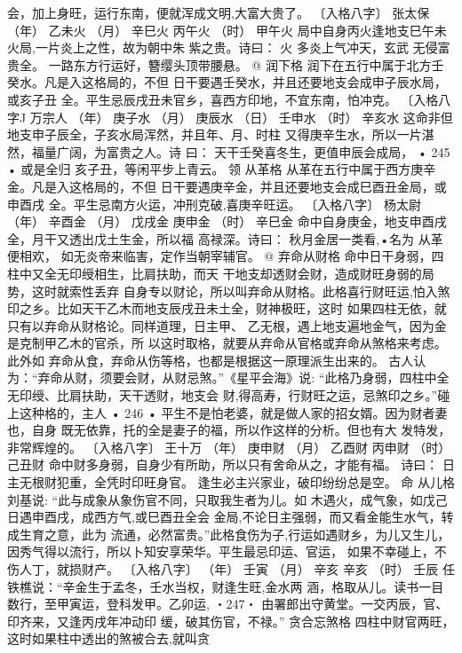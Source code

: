会，加上身旺，运行东南，便就浑成文明,大富大贵了。
〔入格八字〕 张太保
（年） 乙未火
（月） 辛巳火
丙午火
（时） 甲午火
局中自身丙火逢地支巳午未火局,一片炎上之性，故为朝中朱
紫之贵。诗曰：
火 多炎上气冲天，玄武 无侵富贵全。
一路东方行运好，簪缨头顶带腰悬。
@ 润下格
润下在五行中属于北方壬癸水。凡是入这格局的，不但
日干要遇壬癸水，并且还要地支会成申子辰水局，或亥子丑
全。平生忌辰戌丑未官乡，喜西方印地，不宜东南，怕冲克。
〔入格八字J 万宗人
（年） 庚子水
（月） 庚辰水
（日） 壬申水
（时） 辛亥水
这命非但地支申子辰全，子亥水局浑然，并且年、月、时柱
又得庚辛生水，所以一片湛然，福量广阔，为富贵之人。诗
曰：
天干壬癸喜冬生，更值申辰会成局，
• 245 •
或是全归 亥子丑，等闲平步上青云。
领 从革格
从革在五行中属于西方庚辛金。凡是入这格局的，不但
日干要遇庚辛金，并且还要地支会成巳酉丑金局，或申酉戌
全。平生忌南方火运，冲刑克破,喜庚辛旺运。
〔入格八字〕 杨太尉
（年） 辛酉金
（月） 戊戌金
庚申金
（时） 辛巳金
命中自身庚金，地支申酉戌全，月干又透出戊土生金，所以福
高禄深。诗曰：
秋月金居一类看,•名为 从革便相欢，
如无炎帝来临害，定作当朝宰辅官。
@ 弃命从财格
命中日干身弱，四柱中又全无印绶相生，比肩扶助，而天
干地支却透财会财，造成财旺身弱的局势，这时就索性丢弃
自身专以财论，所以叫弃命从财格。此格喜行财旺运,怕入煞
印之乡。比如天干乙木而地支辰戌丑未土全，财神极旺，这时
如果四柱无依，就只有以弃命从财格论。同样道理，日主甲、
乙无根，遇上地支遍地金气，因为金是克制甲乙木的官杀，所
以这时取格，就要从弃命从官格或弃命从煞格来考虑。此外如
弃命从食，弃命从伤等格，也都是根据这一原理派生出来的。
古人认为：“弃命从财，须要会财，从财忌煞。”《星平会海》说:
“此格乃身弱，四柱中全无印绶、比肩扶助，天干透财，地支会
财,得高寿，行财旺之运，忌煞印之乡。”碰上这种格的，主人
• 246 •
平生不是怕老婆，就是做人家的招女婿。因为财者妻也，自身
既无依靠，托的全是妻子的福，所以作这样的分析。但也有大
发特发，非常辉煌的。
〔入格八字〕 王十万
（年） 庚申财
（月） 乙酉财
丙申财
（时） 己丑财
命中财多身弱，自身少有所助，所以只有舍命从之，才能有福。
诗曰：
日 主无根财犯重，全凭时印旺身官。
逢生必主兴家业，破印纷纷总是空。
命 从儿格
刘基说: “此与成象从象伤官不同，只取我生者为儿。如
木遇火，成气象，如戊己日遇申酉戌，成西方气,或巳酉丑全会
金局,不论日主强弱，而又看金能生水气，转成生育之意，此为
流通，必然富贵。”此格食伤为子,行运如遇财乡，为儿又生儿，
因秀气得以流行，所以卜知安享荣华。平生最忌印运、官运，
如果不幸碰上，不伤人丁，就损财产。
〔入格八字〕
（年） 壬寅
（月） 辛亥
辛亥
（时） 壬辰
任铁樵说：“辛金生于孟冬，壬水当权，财逢生旺,金水两
涵，格取从儿。读书一目数行，至甲寅运，登科发甲。乙卯运,
・247・
由署郎出守黄堂。一交丙辰，官、印齐来，又逢丙戌年冲动印
缓，破其伤官，不禄。”
贪合忘煞格
四柱中财官两旺，这时如果柱中透出的煞被合去,就叫贪
